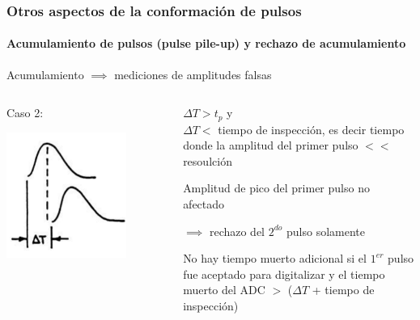 \documentclass{beamer}
\begin{document}
\begin{frame}
\frametitle{Otros aspectos de la conformación de pulsos}
\framesubtitle{Acumulamiento de pulsos (pulse pile-up) y rechazo de acumulamiento} 
\begin{alertblock}{}
Acumulamiento $\implies$ mediciones de amplitudes falsas
\end{alertblock}
\begin{columns}
\begin{column}{0.40\textwidth}

\alert{Caso 2:}

\begin{center}
\includegraphics[width=0.75\textwidth]{d2/pileup_case2}
\end{center}

\end{column} 
\begin{column}{0.60\textwidth}
$\Delta T > t_p$ y \\
$\Delta T <$ tiempo de inspección, es decir tiempo donde la amplitud 
del primer pulso $<<$ resoulción

Amplitud de pico del primer pulso no afectado 

$\implies$ rechazo del $2^{do}$ pulso solamente

No hay tiempo muerto adicional si el $1^{er}$ pulso fue aceptado para 
digitalizar y el tiempo muerto del ADC $>$ ($\Delta T$ + tiempo de 
inspección)
\end{column}
\end{columns}
\end{frame} 
\end{document}
